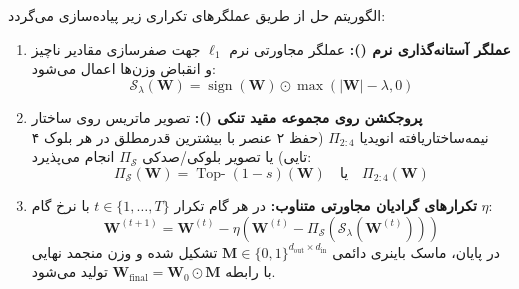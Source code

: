 الگوریتم حل از طریق عملگرهای تکراری زیر پیاده‌سازی می‌گردد:
\begin{enumerate}
    \item \textbf{عملگر آستانه‌گذاری نرم ():}
    عملگر مجاورتی نرم $\ell_1$ جهت صفرسازی مقادیر ناچیز و انقباض وزن‌ها اعمال می‌شود:
    \begin{equation}
    \mathcal{S}_{\lambda}(\mathbf{W}) = \operatorname{sign}(\mathbf{W}) \odot \max(|\mathbf{W}| - \lambda, 0)
    \end{equation}

    \item \textbf{پروجکشن روی مجموعه مقید تنکی ():}
    تصویر ماتریس روی ساختار نیمه‌ساختاریافته انویدیا $\Pi_{2:4}$ (حفظ ۲ عنصر با بیشترین قدرمطلق در هر بلوک ۴ تایی) یا تصویر بلوکی/صدکی $\Pi_{\mathcal{S}}$ انجام می‌پذیرد:
    \begin{equation}
    \Pi_{\mathcal{S}}(\mathbf{W}) = \operatorname{Top-}(1-s)(\mathbf{W}) \quad \text{یا} \quad \Pi_{2:4}(\mathbf{W})
    \end{equation}

    \item \textbf{تکرارهای گرادیان مجاورتی متناوب:}
    در هر گام تکرار $t \in \{1, \dots, T\}$ با نرخ گام $\eta$:
    \begin{equation}
    \mathbf{W}^{(t+1)} = \mathbf{W}^{(t)} - \eta \left( \mathbf{W}^{(t)} - \Pi_{\mathcal{S}}(\mathcal{S}_{\lambda}(\mathbf{W}^{(t)})) \right)
    \end{equation}
    در پایان، ماسک باینری دائمی $\mathbf{M} \in \{0, 1\}^{d_{\text{out}} \times d_{\text{in}}}$ تشکیل شده و وزن منجمد نهایی با رابطه $\mathbf{W}_{\text{final}} = \mathbf{W}_0 \odot \mathbf{M}$ تولید می‌شود.
\end{enumerate}

